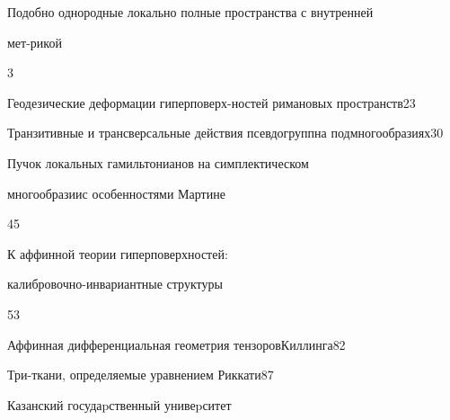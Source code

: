 

{Подобно однородные локально полные пространства с внутренней


мет-\newline рикой}{3}




{Геодезические деформации гиперповерх-\newline ностей римановых пространств}{23}




{Транзитивные и  трансверсальные действия псевдогрупп\newline на подмногообразиях}{30}




{Пучок локальных гамильтонианов на симплектическом


многообразии\newline с особенностями Мартине}{45}




{К аффинной теории гиперповерхностей: 


калибровочно-инвариантные структуры}{53}




{Аффинная дифференциальная геометрия тензоров\newline Киллинга}{82}




{Три-ткани, определяемые уравнением Риккати}{87}











\vfill


\noindent\raisebox{2pt}{\copyright} Казанский госудаpственный унивеpситет





